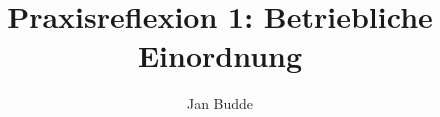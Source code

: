 \documentclass{scrartcl}						%
\begin{document}
\title{Praxisreflexion 1: Betriebliche Einordnung}
\author{Jan Budde}

\publishers{Begutachtende: Dr. Birte Janssen}
\maketitle %

\renewcommand{\abstractname}{Abstract} %
\thispagestyle{empty}



\pagebreak
\tableofcontents %
\pagebreak


\pagebreak

\thispagestyle{fancy}


\pagebreak


\renewcommand{\bibname}{Literatur}	%
%

\end{document}
